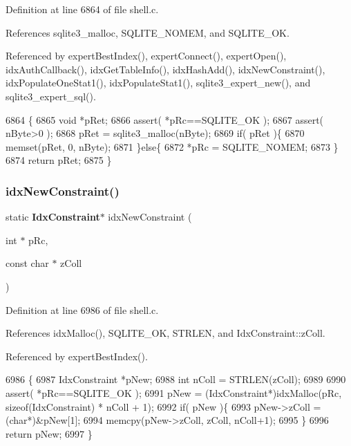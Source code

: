 Definition at line 6864 of file shell.\+c.



References sqlite3\+\_\+malloc, S\+Q\+L\+I\+T\+E\+\_\+\+N\+O\+M\+EM, and S\+Q\+L\+I\+T\+E\+\_\+\+OK.



Referenced by expert\+Best\+Index(), expert\+Connect(), expert\+Open(), idx\+Auth\+Callback(), idx\+Get\+Table\+Info(), idx\+Hash\+Add(), idx\+New\+Constraint(), idx\+Populate\+One\+Stat1(), idx\+Populate\+Stat1(), sqlite3\+\_\+expert\+\_\+new(), and sqlite3\+\_\+expert\+\_\+sql().


\begin{DoxyCode}
6864                                            \{
6865   \textcolor{keywordtype}{void} *pRet;
6866   assert( *pRc==SQLITE_OK );
6867   assert( nByte>0 );
6868   pRet = sqlite3_malloc(nByte);
6869   \textcolor{keywordflow}{if}( pRet )\{
6870     memset(pRet, 0, nByte);
6871   \}\textcolor{keywordflow}{else}\{
6872     *pRc = SQLITE_NOMEM;
6873   \}
6874   \textcolor{keywordflow}{return} pRet;
6875 \}
\end{DoxyCode}
\mbox{\label{shell_8c_aae8786963deda2cb5cd5fa92ebd775fa}} 
\subsubsection{idx\+New\+Constraint()}
{\footnotesize\ttfamily static \textbf{ Idx\+Constraint}$\ast$ idx\+New\+Constraint (\begin{DoxyParamCaption}\item[{int $\ast$}]{p\+Rc,  }\item[{const char $\ast$}]{z\+Coll }\end{DoxyParamCaption})\hspace{0.3cm}{\ttfamily [static]}}



Definition at line 6986 of file shell.\+c.



References idx\+Malloc(), S\+Q\+L\+I\+T\+E\+\_\+\+OK, S\+T\+R\+L\+EN, and Idx\+Constraint\+::z\+Coll.



Referenced by expert\+Best\+Index().


\begin{DoxyCode}
6986                                                                    \{
6987   IdxConstraint *pNew;
6988   \textcolor{keywordtype}{int} nColl = STRLEN(zColl);
6989 
6990   assert( *pRc==SQLITE_OK );
6991   pNew = (IdxConstraint*)idxMalloc(pRc, \textcolor{keyword}{sizeof}(IdxConstraint) * nColl + 1);
6992   \textcolor{keywordflow}{if}( pNew )\{
6993     pNew->zColl = (\textcolor{keywordtype}{char}*)&pNew[1];
6994     memcpy(pNew->zColl, zColl, nColl+1);
6995   \}
6996   \textcolor{keywordflow}{return} pNew;
6997 \}
\end{DoxyCode}
\mbox{\label{shell_8c_acfa10c4168ebb7a78886d879ab6e0230}} 
